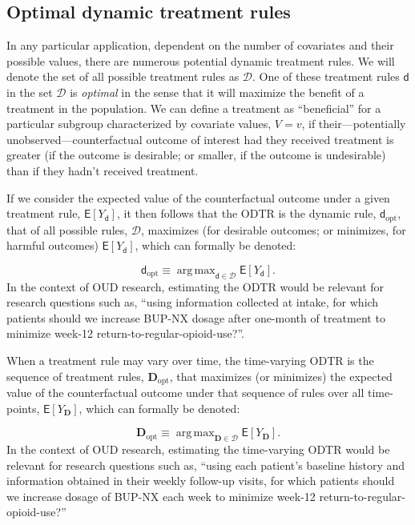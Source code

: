 \documentclass[11pt]{article}
\DeclareMathOperator*{\argmax}{arg\,max}
\renewcommand{\d}{\mathsf{d}}
\newcommand{\E}{\mathsf{E}}
\theoremstyle{example}
\begin{document}
\subsection*{Optimal dynamic treatment rules} 
	
In any particular application, dependent on the number of covariates and their possible values, there are numerous potential dynamic treatment rules. We will denote the set of all possible treatment rules as $\mathcal{D}$. One of these treatment rules $\d$ in the set $\mathcal{D}$ is \emph{optimal} in the sense that it will maximize the benefit of a treatment in the population. \citep{murphyODTR2003} We can define a treatment as ``beneficial'' for a particular subgroup characterized by covariate values, $V=v$, if their---potentially unobserved---counterfactual outcome of interest had they received treatment is greater (if the outcome is desirable; or smaller, if the outcome is undesirable) than if they hadn't received treatment.

If we consider the expected value of the counterfactual outcome under a given treatment rule, $\E[Y_\d]$, it then follows that the ODTR is the dynamic rule, $\d_{\text{opt}}$, that of all possible rules, $\mathcal{D}$, maximizes (for desirable outcomes; or minimizes, for harmful outcomes) $\E[Y_\d]$, which can formally be denoted:
	
$$
\d_{\text{opt}} \equiv \argmax_{\d \in \mathcal{D}} \E [Y_{\d}].
$$
In the context of OUD research, estimating the ODTR would be relevant for research questions such as, ``using information collected at intake, for which patients should we increase BUP-NX dosage after one-month of treatment to minimize week-12 return-to-regular-opioid-use?''.

When a treatment rule may vary over time, the time-varying ODTR is the sequence of treatment rules, $\mathbf{D}_{\text{opt}}$, that maximizes (or minimizes) the expected value of the counterfactual outcome under that sequence of rules over all time-points, $\E [Y_{\mathbf{D}}]$, which can formally be denoted:

$$
\mathbf{D}_{\text{opt}} \equiv \argmax_{\mathbf{D} \in \mathcal{D}} \E [Y_{\mathbf{D}}].
$$
In the context of OUD research, estimating the time-varying ODTR would be relevant for research questions such as, ``using each patient's baseline history and information obtained in their weekly follow-up visits, for which patients should we increase dosage of BUP-NX each week to minimize week-12 return-to-regular-opioid-use?''
\end{document}
